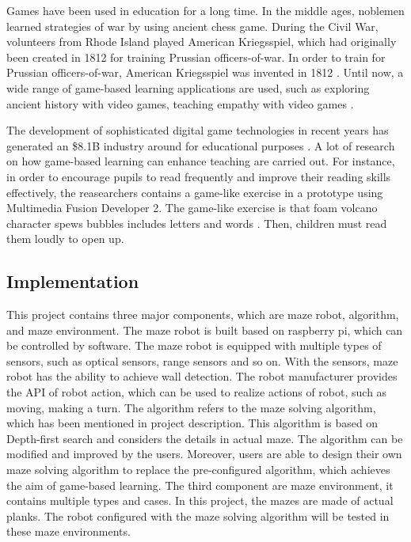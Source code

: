 \documentclass[11pt,times,oneside,openright,hardcopy]{eeereport}
\begin{document}
Games have been used in education for a long time. In the middle ages, noblemen learned strategies of war by using ancient chess game. 
During the Civil War, volunteers from Rhode Island played American Kriegsspiel, which had originally been created in 1812 for training Prussian officers-of-war.
In order to train for Prussian officers-of-war, American Kriegsspiel was invented in 1812 \cite{Fenn:2014dm}.
Until now, a wide range of game-based learning applications are used, such as exploring ancient history with video games,
teaching empathy with video games \cite{Prensky:2007wt}.

The development of sophisticated digital game technologies in recent years has generated an \$8.1B industry around for educational purposes \cite{An:2018uv}. 
A lot of research on how game-based learning can enhance teaching are carried out. For instance, in order to encourage pupils to read frequently and
improve their reading skills effectively, the reasearchers contains a game-like exercise in a prototype using Multimedia Fusion Developer 2.
The game-like exercise is that foam volcano character spews bubbles includes letters and words \cite{AdrirScott:2013ui}. Then, children must read them loudly to open up.


\subsection{Implementation}
This project contains three major components, which are maze robot, algorithm, and maze environment.
The maze robot is built based on raspberry pi, which can be controlled by software. The maze robot is equipped with multiple types of sensors, such as optical sensors, range sensors and so on. With the sensors, maze robot has the ability to achieve wall detection. The robot manufacturer provides the API of robot action, which can be used to realize actions of robot, such as moving, making a turn.
The algorithm refers to the maze solving algorithm, which has been mentioned in project description. This algorithm is based on Depth-first search and considers the details in actual maze. The algorithm can be modified and improved by the users. Moreover, users are able to design their own maze solving algorithm to replace the pre-configured algorithm, which achieves the aim of game-based learning.
The third component are maze environment, it contains multiple types and cases. In this project, the mazes are made of actual planks. The robot configured with the maze solving algorithm will be tested in these maze environments.
\end{document}
